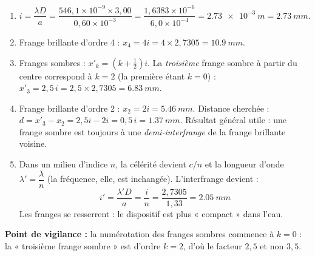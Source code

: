 \documentclass[11pt]{article}
\begin{document}
\begin{corrige}
\begin{enumerate}
    \item $i = \dfrac{\lambda D}{a} = \dfrac{546,1\times10^{-9} \times 3,00}{0,60\times10^{-3}} = \dfrac{1,6383\times10^{-6}}{6,0\times10^{-4}} = \SI{2,73e-3}{m} = \boxed{\SI{2,73}{mm}}$.
    \item Frange brillante d'ordre 4 : $x_4 = 4i = 4 \times 2,7305 = \boxed{\SI{10,9}{mm}}$.
    \item Franges sombres : $x'_k = \left(k+\tfrac{1}{2}\right)i$. La \emph{troisième} frange sombre à partir du centre correspond à $k = 2$ (la première étant $k=0$) :
    $x'_3 = 2,5\,i = 2,5 \times 2,7305 = \boxed{\SI{6,83}{mm}}$.
    \item Frange brillante d'ordre 2 : $x_2 = 2i = \SI{5,46}{mm}$. Distance cherchée :
    $d = x'_3 - x_2 = 2,5i - 2i = 0,5\,i = \boxed{\SI{1,37}{mm}}$.
    Résultat général utile : une frange sombre est toujours à une \emph{demi-interfrange} de la frange brillante voisine.
    \item Dans un milieu d'indice $n$, la célérité devient $c/n$ et la longueur d'onde $\lambda' = \dfrac{\lambda}{n}$ (la fréquence, elle, est inchangée). L'interfrange devient :
    \[ i' = \frac{\lambda' D}{a} = \frac{i}{n} = \frac{2,7305}{1,33} = \boxed{\SI{2,05}{mm}} \]
    Les franges se resserrent : le dispositif est plus « compact » dans l'eau.
\end{enumerate}
\textbf{Point de vigilance :} la numérotation des franges sombres commence à $k = 0$ : la « troisième frange sombre » est d'ordre $k = 2$, d'où le facteur $2{,}5$ et non $3{,}5$.
\end{corrige}
\end{document}
